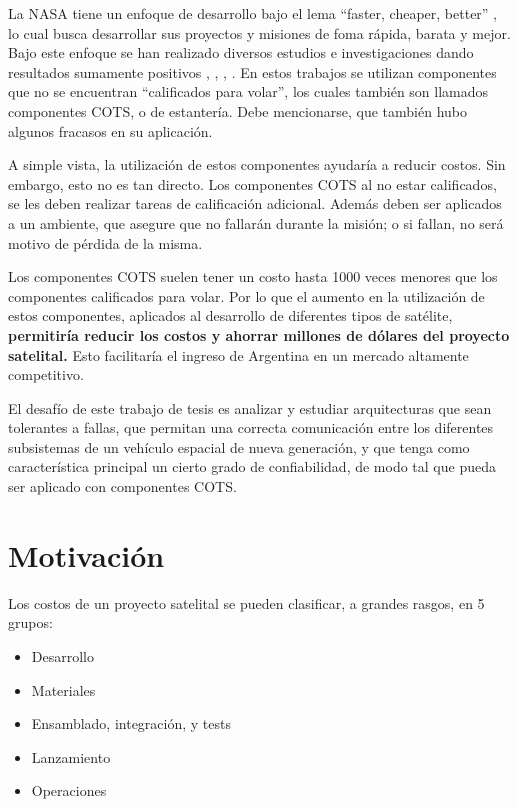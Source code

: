 La \ac{NASA} tiene un enfoque de desarrollo bajo el lema 
``faster, cheaper, better'' \cite{Forsberg99}, lo cual busca desarrollar sus proyectos y misiones 
de foma rápida, barata y mejor. Bajo este enfoque se han realizado diversos estudios e 
investigaciones dando resultados sumamente positivos \cite{Tai99}, \cite{Chau99}, 
\cite{Schneidewind98}, \cite{Forsberg99}. En estos trabajos se utilizan componentes que no se 
encuentran ``calificados para volar'',  los cuales también son llamados componentes \ac{COTS}, o de estantería. Debe mencionarse, que también hubo algunos 
fracasos en su aplicación. 

A simple vista, la utilización de estos componentes ayudaría a reducir costos. Sin embargo, esto 
no es tan directo. Los componentes \ac{COTS} al no estar calificados, se les deben realizar tareas 
de calificación adicional. Además deben ser aplicados a un ambiente, que asegure 
que no fallarán durante la misión; o si fallan, no será motivo de pérdida de la misma. 

Los componentes \ac{COTS} suelen tener un costo hasta 1000 veces menores que los componentes
calificados para volar. Por lo que el aumento en la utilización de estos componentes, 
aplicados al desarrollo de diferentes tipos de satélite, \textbf{permitiría reducir los costos y 
ahorrar millones de dólares del proyecto satelital.} Esto facilitaría el ingreso de 
Argentina en un mercado altamente competitivo.

El desafío de este trabajo de tesis es analizar y estudiar arquitecturas que sean tolerantes a 
fallas, que permitan una correcta comunicación entre los diferentes subsistemas de un vehículo 
espacial de nueva generación, y que tenga como característica principal un cierto grado de confiabilidad, de modo tal que pueda ser aplicado con componentes \ac{COTS}.

\section{Motivación}\label{chap:motivacion}
Los costos de un proyecto satelital se pueden clasificar, a grandes rasgos, en 5 grupos:
\begin{itemize}
 \item Desarrollo
 \item Materiales
 \item Ensamblado, integración, y tests
 \item Lanzamiento
 \item Operaciones
\end{itemize}

